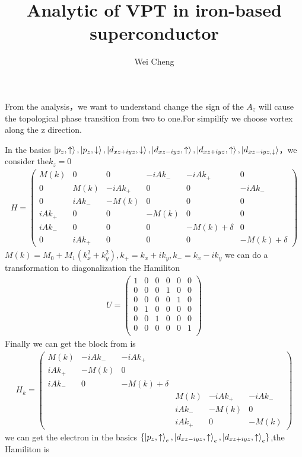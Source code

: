 \documentclass[4pt]{article}
\title{\LARGE {Analytic of VPT in iron-based superconductor}}
\author{\Large{Wei Cheng}}
\date{\Large{}}
\begin{document}
		\maketitle
		\large
		From the analysis，we want to understand change the sign of the $A_z$ will cause the topological phase transition from two to one.For simpilify we choose vortex along the z direction.
		\par 
		In the basics $\ket{p_z,\uparrow},\ket{p_z,\downarrow},\ket{d_{xz+iyz},\downarrow},\ket{d_{xz-iyz},\uparrow},\ket{d_{xz+iyz},\uparrow},\ket{d_{xz-iyz,\downarrow}}$，we consider the$k_z=0$
	\begin{align}
		H=
		\begin{pmatrix}
			M(k) &0&0 &-iAk_{-} &-iAk_{+}&0\\
			0&M(k)&-iAk_{+}&0&0&-iAk_{-}\\
			0&iAk_{-}&-M(k)&0&0&0\\
			iAk_{+}&0&0&-M(k)&0&0\\
			iAk_{-}&0&0&0&-M(k)+\delta&0\\
			0&iAk_{+}&0&0&0&-M(k)+\delta
		\end{pmatrix}
	\end{align}
	$M(k)=M_0+M_1(k_x^2+k_y^2),k_{+}=k_x+ik_y,k_{-}=k_x-ik_y$
	we can do a transformation to diagonalization
	the Hamiliton
	\begin{align}
		U=
		\begin{pmatrix}
			1&0&0&0&0&0\\
			0&0&0&1&0&0\\
			0&0&0&0&1&0\\
			0&1&0&0&0&0\\
			0&0&1&0&0&0\\
			0&0&0&0&0&1\\
		\end{pmatrix}
	\end{align}
	Finally we can get the block from is
	\begin{align}
		H_k=
		\begin{pmatrix}
			M(k)&-iAk_{-}&-iAk_{+}&&&\\
			iAk_{+}&-M(k)&0&&&\\
			iAk_{-}&0&-M(k)+\delta&&&\\
			&&&M(k)&-iAk_{+}&-iAk_{-}\\
			&&&iAk_{-}&-M(k)&0\\
			&&&iAk_{+}&0&-M(k)
		\end{pmatrix}
	\end{align}
we can get the electron in the basics $\{\ket{p_z,\uparrow}_e,\ket{d_{xz-iyz},\uparrow}_e,\ket{d_{xz+iyz},\uparrow}_e\}$,the Hamiliton is 
\end{document}
